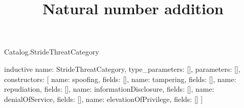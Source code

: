 \begin{lexlean}{Catalog.StrideThreatCategory}
\title{Natural number addition}
\begin{semanticmodule}
inductive{
  name: StrideThreatCategory,
  type_parameters: [],
  parameters: [],
  constructors: [
    {name: spoofing, fields: []},
    {name: tampering, fields: []},
    {name: repudiation, fields: []},
    {name: informationDisclosure, fields: []},
    {name: denialOfService, fields: []},
    {name: elevationOfPrivilege, fields: []}
  ]
}
\end{semanticmodule}
\end{lexlean}
